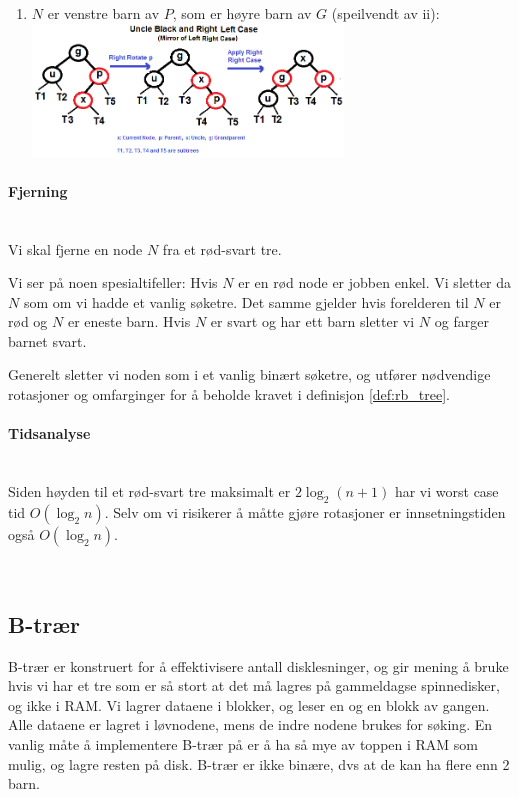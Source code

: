 \begin{enumerate}
\begin{enumerate}
\begin{enumerate}
			\item $ N $ er venstre barn av $ P $, som er høyre barn av $ G $ (speilvendt av ii):\\
			\includegraphics[width=0.65\textwidth]{fig/rbt_rl.png}\\
			
		\end{enumerate}
	\end{enumerate}
\end{enumerate}


\paragraph{Fjerning}~\\
Vi skal fjerne en node $ N $ fra et rød-svart tre.

Vi ser på noen spesialtifeller: Hvis $ N $ er en rød node er jobben enkel. Vi sletter da $ N $ som om vi hadde et vanlig søketre. Det samme gjelder hvis forelderen til $ N $ er rød og $ N $ er eneste barn. Hvis $ N $ er svart og har ett barn sletter vi $ N $ og farger barnet svart. 

Generelt sletter vi noden som i et vanlig binært søketre, og utfører nødvendige rotasjoner og omfarginger for å beholde kravet i definisjon \ref{def:rb_tree}.


\paragraph{Tidsanalyse}~\\
Siden høyden til et rød-svart tre maksimalt er $ 2\log_2 (n+1) $ har vi worst case tid $ O(\log_2 n) $. Selv om vi risikerer å måtte gjøre rotasjoner er innsetningstiden også $ O(\log_2 n) $.


~\\
\subsection{B-trær} \label{b-tre}
B-trær er konstruert for å effektivisere antall disklesninger, og gir mening å bruke hvis vi har et tre som er så stort at det må lagres på gammeldagse spinnedisker, og ikke i RAM. Vi lagrer dataene i blokker, og leser en og en blokk av gangen. Alle dataene er lagret i løvnodene, mens de indre nodene brukes for søking. En vanlig måte å implementere B-trær på er å ha så mye av toppen i RAM som mulig, og lagre resten på disk. B-trær er ikke binære, dvs at de kan ha flere enn 2 barn. 

